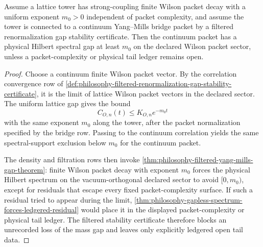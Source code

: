 \begin{theorem}
\label{thm:philosophy-renormalization-bridge-preserves-mass-gap}
Assume a lattice tower has strong-coupling finite Wilson packet decay with a
uniform exponent $m_0>0$ independent of packet complexity, and assume the
tower is connected to a continuum Yang--Mills bridge packet by a filtered
renormalization gap stability certificate. Then the continuum packet has a
physical Hilbert spectral gap at least $m_0$ on the declared Wilson packet
sector, unless a packet-complexity or physical tail ledger remains open.
\end{theorem}
\begin{proof}
Choose a continuum finite Wilson packet vector. By the correlation
convergence row of
\autoref{def:philosophy-filtered-renormalization-gap-stability-certificate}, it is
the limit of lattice Wilson packet vectors in the declared sector. The
uniform lattice gap gives the bound
$$
C_{O,n}(t)\le K_{O,n}e^{-m_0t}
$$
with the same exponent $m_0$ along the tower, after the packet normalization
specified by the bridge row. Passing to the continuum correlation yields the
same spectral-support exclusion below $m_0$ for the continuum packet.

The density and filtration rows then invoke
\autoref{thm:philosophy-filtered-yang-mills-gap-theorem}: finite Wilson
packet decay with exponent $m_0$ forces the physical Hilbert spectrum on the
vacuum-orthogonal declared sector to avoid $[0,m_0)$, except for residuals
that escape every fixed packet-complexity surface. If such a residual tried
to appear during the limit,
\autoref{thm:philosophy-gapless-spectrum-forces-ledgered-residual} would
place it in the displayed packet-complexity or physical tail ledger. The
filtered stability certificate therefore blocks an unrecorded loss of the
mass gap and leaves only explicitly ledgered open tail data.
\end{proof}

